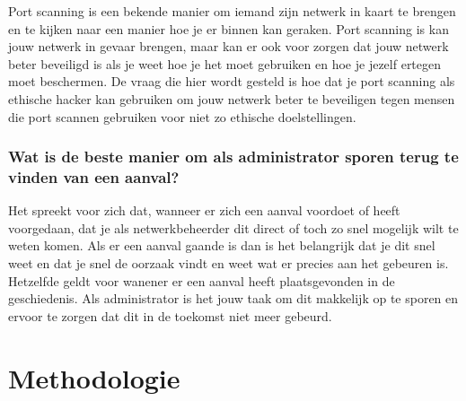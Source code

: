 \documentclass[pdftex,a4paper,12pt]{report}
\begin{document}
Port scanning is een bekende manier om iemand zijn netwerk in kaart te brengen en te kijken naar een manier hoe je er binnen kan geraken. Port scanning is kan jouw netwerk in gevaar brengen, maar kan er ook voor zorgen dat jouw netwerk beter beveiligd is als je weet hoe je het moet gebruiken en hoe je jezelf ertegen moet beschermen. De vraag die hier wordt gesteld is hoe dat je port scanning als ethische hacker kan gebruiken om jouw netwerk beter te beveiligen tegen mensen die port scannen gebruiken voor niet zo ethische doelstellingen.

\subsection{Wat is de beste manier om als administrator sporen terug te vinden van een aanval?}

Het spreekt voor zich dat, wanneer er zich een aanval voordoet of heeft voorgedaan, dat je als netwerkbeheerder dit direct of toch zo snel mogelijk wilt te weten komen. Als er een aanval gaande is dan is het belangrijk dat je dit snel weet en dat je snel de oorzaak vindt en weet wat er precies aan het gebeuren is. Hetzelfde geldt voor wanener er een aanval heeft plaatsgevonden in de geschiedenis. Als administrator is het jouw taak om dit makkelijk op te sporen en ervoor te zorgen dat dit in de toekomst niet meer gebeurd.

\chapter{Methodologie}
\label{ch:methodologie}
\newpage

\end{document}
